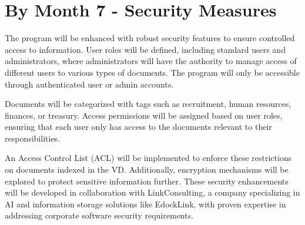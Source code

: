 \section{By Month 7 - Security Measures}

The program will be enhanced with robust security features to ensure controlled access to information. User roles will be defined, including standard users and administrators, where administrators will have the authority to manage access of different users to various types of documents. The program will only be accessible through authenticated user or admin accounts.

Documents will be categorized with tags such as recruitment, human resources, finances, or treasury. Access permissions will be assigned based on user roles, ensuring that each user only has access to the documents relevant to their responsibilities.

An Access Control List (ACL) will be implemented to enforce these restrictions on documents indexed in the \ac{VD}. Additionally, encryption mechanisms will be explored to protect sensitive information further. These security enhancements will be developed in collaboration with LinkConsulting, a company specializing in AI and information storage solutions like EdockLink, with proven expertise in addressing corporate software security requirements.



